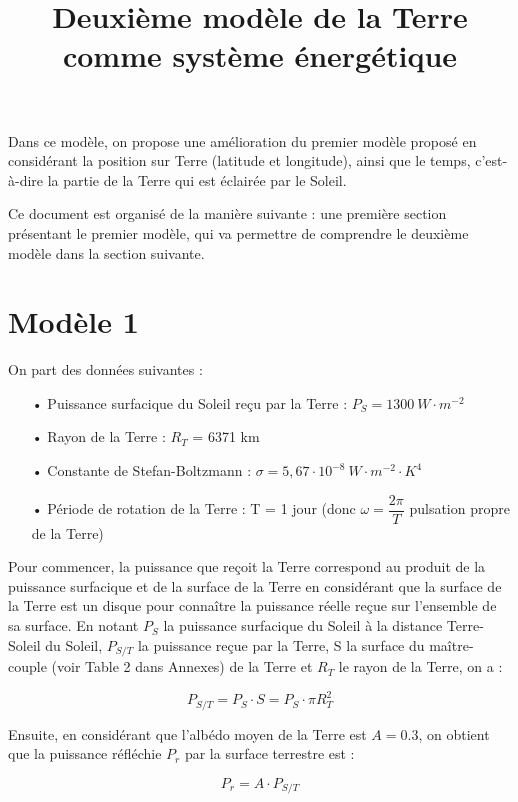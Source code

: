 \documentclass[a4paper,11pt]{article}
\title{Deuxième modèle de la Terre comme système énergétique}
\begin{document}
\maketitle

Dans ce modèle, on propose une amélioration du premier modèle proposé en considérant la position sur Terre (latitude et longitude), ainsi que le temps, c'est-à-dire la partie de la Terre qui est éclairée par le Soleil. 

Ce document est organisé de la manière suivante : une première section présentant le premier modèle, qui va permettre de comprendre le deuxième modèle dans la section suivante.

\section{Modèle 1}

On part des données suivantes :

\begin{enumerate}

\item[•] Puissance surfacique du Soleil reçu par la Terre : $P_S = 1300 ~ W \cdot m^{-2}$
\item[•] Rayon de la Terre : $R_T$ = 6371 km
\item[•] Constante de Stefan-Boltzmann : $\sigma = 5,67 \cdot 10^{-8} ~ W \cdot m^{-2} \cdot K^4$ 
\item[•] Période de rotation de la Terre : T = 1 jour (donc $\omega = \dfrac{2\pi}{T}$ pulsation propre de la Terre)

\end{enumerate}

Pour commencer, la puissance que reçoit la Terre correspond au produit de la puissance surfacique et de la surface de la Terre en considérant que la surface de la Terre est un disque pour connaître la puissance réelle reçue sur l'ensemble de sa surface. En notant $P_S$ la puissance surfacique du Soleil à la distance Terre-Soleil du Soleil, $P_{S/T}$ la puissance reçue par la Terre, S la surface du maître-couple (voir Table 2 dans Annexes) de la Terre et $R_T$ le rayon de la Terre, on a :

\[ P_{S/T} = P_S \cdot S = P_S \cdot \pi R_T^2  \]

Ensuite, en considérant que l'albédo moyen de la Terre est $A = 0.3$, on obtient que la puissance réfléchie $P_r$ par la surface terrestre est :

\[ P_r = A \cdot P_{S/T} \]
\end{document}
